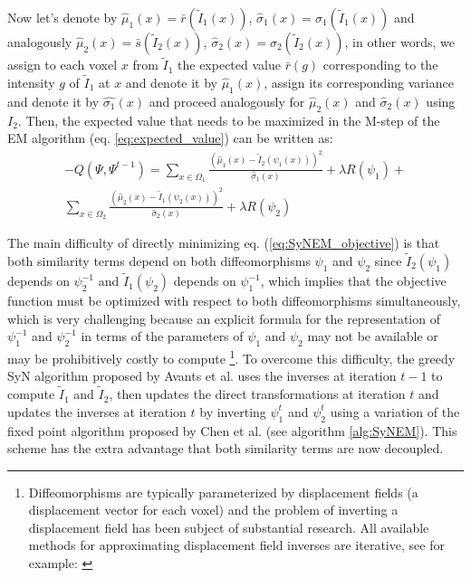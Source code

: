 \documentclass[11pt]{article}
\begin{document}
Now let's denote by $\hat{\mu}_{1}(x) = \bar{r}(\tilde{I}_{1}(x))$, $\hat{\sigma}_{1}(x) = \sigma_{1}(\tilde{I}_{1}(x))$ and analogously $\hat{\mu}_{2}(x) = \bar{s}(\tilde{I}_{2}(x))$, $\hat{\sigma}_{2}(x) = \sigma_{2}(\tilde{I}_{2}(x))$, in other words, we assign to each voxel $x$ from $\tilde{I}_1$ the expected value $\bar{r}(g)$ corresponding to the intensity $g$ of $\tilde{I}_1$ at $x$ and denote it by $\hat{\mu}_{1}(x)$, assign its corresponding variance and denote it by $\hat{\sigma_1}(x)$ and proceed analogously for $\hat{\mu}_{2}(x)$ and $\hat{\sigma}_2(x)$ using $I_2$. Then, the expected value that needs to be maximized in the M-step of the EM algorithm (eq. \ref{eq:expected_value}) can be written as:
\begin{align}\label{eq:SyNEM_objective}
    -Q(\Psi, \Psi^{t-1}) = \sum_{x \in \Omega_{1}} \frac{(\hat{\mu}_{1}(x) - \tilde{I}_2(\psi_{1}(x)))^{2}}{\hat{\sigma}_{1}(x)} + \lambda R(\psi_{1}) + \\
    \nonumber\sum_{x \in \Omega_{2}} \frac{(\hat{\mu}_{2}(x) - \tilde{I}_1(\psi_{2}(x)))^{2}}{\hat{\sigma}_{2}(x)} + \lambda R(\psi_{2})
\end{align}

The main difficulty of directly minimizing eq. (\ref{eq:SyNEM_objective}) is that both similarity terms depend on both diffeomorphisms $\psi_{1}$ and $\psi_{2}$ since $\tilde{I}_{2}(\psi_{1})$ depends on $\psi_{2}^{-1}$ and $\tilde{I}_{1}(\psi_{2})$ depends on $\psi_{1}^{-1}$, which implies that the objective function must be optimized with respect to both diffeomorphisms simultaneously, which is very challenging because an explicit formula for the representation of $\psi_{1}^{-1}$ and $\psi_{2}^{-1}$ in terms of the parameters of $\psi_{1}$ and $\psi_{2}$ may not be available or may be prohibitively costly to compute \footnote{Diffeomorphisms are typically parameterized by displacement fields (a displacement vector for each voxel) and the problem of inverting a displacement field has been subject of substantial research. All available methods for approximating displacement field inverses are iterative, see for example: \cite{Chen2008}\cite{Avants2009}\cite{Christensen2001}\cite{Crum2007}\cite{Yan2010}}. To overcome this difficulty, the greedy SyN algorithm proposed by Avants et al. \cite{Avants2011} uses the inverses at iteration $t-1$ to compute $\tilde{I}_{1}$ and $\tilde{I}_{2}$, then updates the direct transformations at iteration $t$ and updates the inverses at iteration $t$ by inverting $\psi_{1}^{t}$ and $\psi_{2}^{t}$ using a variation of the fixed point algorithm proposed by Chen et al.\cite{Chen2008} (see algorithm \ref{alg:SyNEM}). This scheme has the extra advantage that both similarity terms are now decoupled.\\
\end{document}
